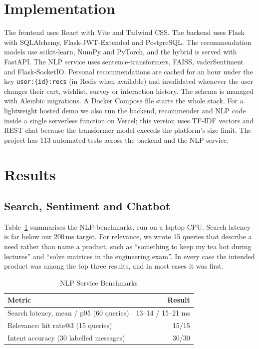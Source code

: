 \documentclass[conference]{IEEEtran}
\begin{document}
\section{Implementation}
The frontend uses React with Vite and Tailwind CSS. The backend uses Flask with SQLAlchemy, Flask-JWT-Extended and PostgreSQL. The recommendation models use scikit-learn, NumPy and PyTorch, and the hybrid is served with FastAPI. The NLP service uses sentence-transformers, FAISS, vaderSentiment and Flask-SocketIO. Personal recommendations are cached for an hour under the key \texttt{user:\{id\}:recs} (in Redis when available) and invalidated whenever the user changes their cart, wishlist, survey or interaction history. The schema is managed with Alembic migrations. A Docker Compose file starts the whole stack. For a lightweight hosted demo we also run the backend, recommender and NLP code inside a single serverless function on Vercel; this version uses TF-IDF vectors and REST chat because the transformer model exceeds the platform's size limit. The project has 113 automated tests across the backend and the NLP service.

\section{Results}

\subsection{Search, Sentiment and Chatbot}
Table~\ref{tab:nlp} summarises the NLP benchmarks, run on a laptop CPU. Search latency is far below our 200\,ms target. For relevance, we wrote 15 queries that describe a need rather than name a product, such as ``something to keep my tea hot during lectures'' and ``solve matrices in the engineering exam''. In every case the intended product was among the top three results, and in most cases it was first.

\begin{table}[t]
\caption{NLP Service Benchmarks}
\label{tab:nlp}
\centering
\begin{tabular}{@{}lr@{}}
\toprule
Metric & Result \\
\midrule
Search latency, mean / p95 (60 queries) & 13--14 / 15--21 ms \\
Relevance: hit rate@3 (15 queries) & 15/15 \\
Intent accuracy (30 labelled messages) & 30/30 \\
\bottomrule
\end{tabular}
\end{table}
\end{document}
